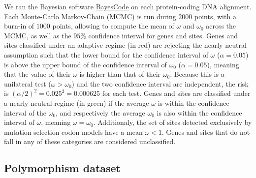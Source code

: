 \documentclass{article}
\begin{document}
    We ran the Bayesian software \href{https://github.com/bayesiancook/bayescode}{BayesCode} on each protein-coding DNA alignment\cite{lartillot_phylobayes_2013, rodrigue_detecting_2017}.
    Each Monte-Carlo Markov-Chain (MCMC) is run during $2000$ points, with a burn-in of $1000$ points, allowing to compute the mean of $\omega$ and $\omega_{0}$ across the MCMC, as well as the $95$\% confidence interval for genes and sites.
    Genes and sites classified under an adaptive regime (in red) are rejecting the nearly-neutral assumption such that the lower bound for the confidence interval of $\omega$ ($\alpha=0.05$) is above the upper bound of the confidence interval of $\omega_{0}$ ($\alpha=0.05$), meaning that the value of their $\omega$ is higher than that of their $\omega_{0}$.
    Because this is a unilateral test ($\omega > \omega_{0}$) and the two confidence interval are independent, the risk is $(\alpha/2)^2=0.025^2=0.000625$ for each test.
    Genes and sites are classified under a nearly-neutral regime (in green) if the average $\omega$ is within the confidence interval of the $\omega_{0}$, and respectively the average $\omega_{0}$ is also within the confidence interval of  $\omega$, meaning $\omega = \omega_{0}$.
    Additionaly, the set of sites detected exclusively by mutation-selection codon models have a mean $\omega < 1 $.
    Genes and sites that do not fall in any of these categories are considered unclassified.

    \subsection*{Polymorphism dataset}
\end{document}
